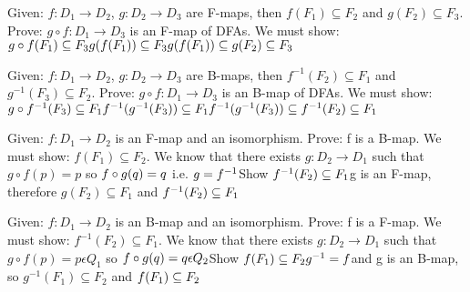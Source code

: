 \documentclass[12pt]{article}
\begin{document}
Given: $f: D_1 \rightarrow D_2$, $ g: D_2 \rightarrow D_3$ are F-maps, then $f(F_1) \subseteq F_2$ and $g(F_2) \subseteq F_3$.
Prove: $g \circ f: D_1 \rightarrow D_3$ is an F-map of DFAs.
We must show: \\
         $g \circ f(F_1) \subseteq F_3 \\
         g(f(F_1)) \subseteq F_3 \\
         g(f(F_1)) \subseteq g(F_2) \subseteq F_3 \\ $

Given: $f: D_1 \rightarrow D_2$, $ g: D_2 \rightarrow D_3$ are B-maps, then $f^{-1}(F_2) \subseteq F_1$ and $g^{-1}(F_3) \subseteq F_2$.
Prove: $g \circ f: D_1 \rightarrow D_3$ is an B-map of DFAs.
We must show: \\
         $g \circ f^{-1}(F_3) \subseteq F_1 \\
         f^{-1}(g^{-1}(F_3)) \subseteq F_1 \\
         f^{-1}(g^{-1}(F_3)) \subseteq f^{-1}(F_2) \subseteq F_1 \\ $

Given: $f: D_1 \rightarrow D_2$ is an F-map and an isomorphism. Prove: f is a B-map. We must show: $f(F_1) \subseteq F_2$. We know that there exists
$g: D_2 \rightarrow D_1$ such that $g \circ f(p)=p$ so $ \\
f \circ g(q)=q$ i.e. $g=f^{-1} \\
$Show $ f^{-1}(F_2) \subseteq F_1 \\
$g is an F-map, therefore $g(F_2) \subseteq F_1$ and $f^{-1}(F_2) \subseteq F_1 \\ $

Given: $f: D_1 \rightarrow D_2$ is an B-map and an isomorphism. Prove: f is a F-map. We must show: $f^{-1}(F_2) \subseteq F_1$. We know that there exists
$g: D_2 \rightarrow D_1$ such that $g \circ f(p)=p \epsilon Q_1$ so $ \\
f \circ g(q)=q \epsilon Q_2  \\
$Show $ f(F_1) \subseteq F_2 \\
g^{-1}=f $and g is an B-map, so $g^{-1}(F_1) \subseteq F_2$ and $f(F_1) \subseteq F_2 \\ $ 
\end{document}
